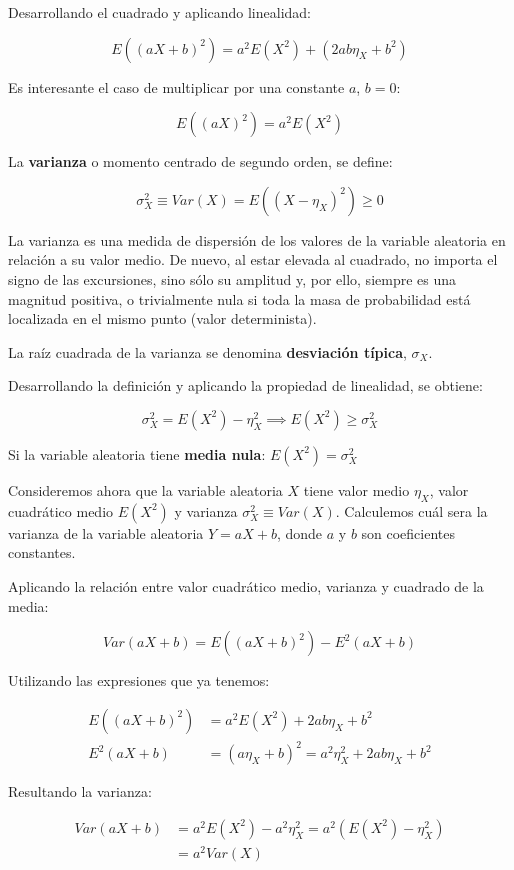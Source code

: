 \documentclass[11pt]{article}
\begin{document}
Desarrollando el cuadrado y aplicando linealidad:

\[E((aX+b)^2) = a^2E(X^2)+(2ab\eta_X+b^2)\]

Es interesante el caso de multiplicar por una constante \(a\), \(b=0\):

\[E((aX)^2) = a^2E(X^2)\]

    La \textbf{varianza} o momento centrado de segundo orden, se define:

\[\sigma_X^2 \equiv Var(X) = E((X-\eta_X)^2) \geq 0\]

La varianza es una medida de dispersión de los valores de la variable
aleatoria en relación a su valor medio. De nuevo, al estar elevada al
cuadrado, no importa el signo de las excursiones, sino sólo su amplitud
y, por ello, siempre es una magnitud positiva, o trivialmente nula si
toda la masa de probabilidad está localizada en el mismo punto (valor
determinista).

La raíz cuadrada de la varianza se denomina \textbf{desviación típica},
\(\sigma_X\).

Desarrollando la definición y aplicando la propiedad de linealidad, se
obtiene:

\[\sigma_X^2 = E(X^2) - \eta_X^2 \implies E(X^2) \geq \sigma_X^2\]

Si la variable aleatoria tiene \textbf{media nula}:
\(E(X^2) = \sigma_X^2\)

    Consideremos ahora que la variable aleatoria \(X\) tiene valor medio
\(\eta_X\), valor cuadrático medio \(E(X^2)\) y varianza
\(\sigma_X^2\equiv Var(X)\). Calculemos cuál sera la varianza de la
variable aleatoria \(Y = aX+b\), donde \(a\) y \(b\) son coeficientes
constantes.

Aplicando la relación entre valor cuadrático medio, varianza y cuadrado
de la media:

\[Var(aX+b) = E((aX+b)^2)-E^2(aX+b)\]

Utilizando las expresiones que ya tenemos:

\begin{align*}
E((aX+b)^2) &= a^2E(X^2)+2ab\eta_X+b^2\\
E^2(aX+b) &= (a\eta_X+b)^2 = a^2\eta_X^2+2ab\eta_X+b^2
\end{align*}

Resultando la varianza:

\begin{align*}
Var(aX+b) &= a^2E(X^2)-a^2\eta_X^2=a^2(E(X^2)-\eta_X^2)\\
&=a^2Var(X)
\end{align*}
\end{document}
